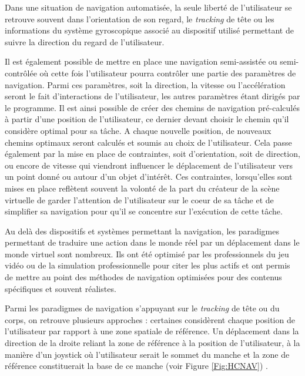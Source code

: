 Dans une situation de navigation automatisée, la seule liberté de l'utilisateur se retrouve souvent dans l'orientation de son regard, le \textit{tracking} de tête ou les informations du système gyroscopique associé au dispositif utilisé permettant de suivre la direction du regard de l'utilisateur.

Il est également possible de mettre en place une navigation semi-assistée ou semi-contrôlée où cette fois l'utilisateur pourra contrôler une partie des paramètres de navigation. Parmi ces paramètres, soit la direction, la vitesse ou l'accélération seront le fait d'interactions de l'utilisateur, les autres paramètres étant dirigés par le programme. Il est ainsi possible de créer des chemins de navigation pré-calculés à partir d'une position de l'utilisateur, ce dernier devant choisir le chemin qu'il considère optimal pour sa tâche. A chaque nouvelle position, de nouveaux chemins optimaux seront calculés et soumis au choix de l'utilisateur.
Cela passe également par la mise en place de contraintes, soit d'orientation, soit de direction, ou encore de vitesse qui viendront influencer le déplacement de l'utilisateur vers un point donné ou autour d'un objet d'intérêt. Ces contraintes, lorsqu'elles sont mises en place reflètent souvent la volonté de la part du créateur de la scène virtuelle de garder l'attention de l'utilisateur sur le coeur de sa tâche et de simplifier sa navigation pour qu'il se concentre sur l’exécution de cette tâche.


Au delà des dispositifs et systèmes permettant la navigation, les paradigmes permettant de traduire une action dans le monde réel par un déplacement dans le monde virtuel sont nombreux. Ils ont été optimisé par les professionnels du jeu vidéo ou de la simulation professionnelle pour citer les plus actifs et ont permis de mettre au point des méthodes de navigation optimisées pour des contenus spécifiques et souvent réalistes.

Parmi les paradigmes de navigation s'appuyant sur le \textit{tracking} de tête ou du corps, on retrouve plusieurs approches : certaines considèrent chaque position de l'utilisateur par rapport à une zone spatiale de référence. Un déplacement dans la direction de la droite reliant la zone de référence à la position de l'utilisateur, à la manière d'un joystick où l'utilisateur serait le sommet du manche et la zone de référence constituerait la base de ce manche (voir Figure \ref{Fig:HCNAV}) \cite{Bourdot2002HCNav}.


